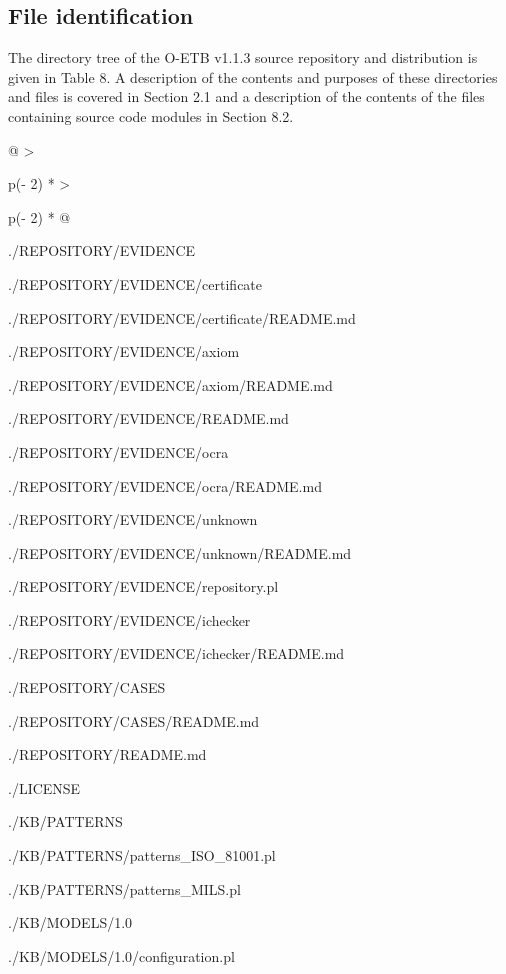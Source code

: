 \documentclass[12pt,twoside,a4paper]{article}
\begin{document}
\hypertarget{file-identification}{%
\subsection{File identification}\label{file-identification}}

The directory tree of the O-ETB v1.1.3 source repository and distribution is given in Table 8. A description of the contents and purposes of these directories and files is covered in Section 2.1 and a description of the contents of the files containing source code modules in Section 8.2.

\begin{longtable}[]{@{}
  >{\raggedright\arraybackslash}p{(\columnwidth - 2\tabcolsep) * }
  >{\raggedright\arraybackslash}p{(\columnwidth - 2\tabcolsep) * }@{}}
\caption{\protect\hypertarget{_Ref160560217}{}{}Table 11 O-ETB v1.1.3 source code modules}\tabularnewline
\toprule
\begin{minipage}[b]{\linewidth}\raggedright
./REPOSITORY/EVIDENCE

./REPOSITORY/EVIDENCE/certificate

./REPOSITORY/EVIDENCE/certificate/README.md

./REPOSITORY/EVIDENCE/axiom

./REPOSITORY/EVIDENCE/axiom/README.md

./REPOSITORY/EVIDENCE/README.md

./REPOSITORY/EVIDENCE/ocra

./REPOSITORY/EVIDENCE/ocra/README.md

./REPOSITORY/EVIDENCE/unknown

./REPOSITORY/EVIDENCE/unknown/README.md

./REPOSITORY/EVIDENCE/repository.pl

./REPOSITORY/EVIDENCE/ichecker

./REPOSITORY/EVIDENCE/ichecker/README.md

./REPOSITORY/CASES

./REPOSITORY/CASES/README.md

./REPOSITORY/README.md

./LICENSE

./KB/PATTERNS

./KB/PATTERNS/patterns\_ISO\_81001.pl

./KB/PATTERNS/patterns\_MILS.pl

./KB/MODELS/1.0

./KB/MODELS/1.0/configuration.pl


\end{minipage}
\end{longtable}
\end{document}
